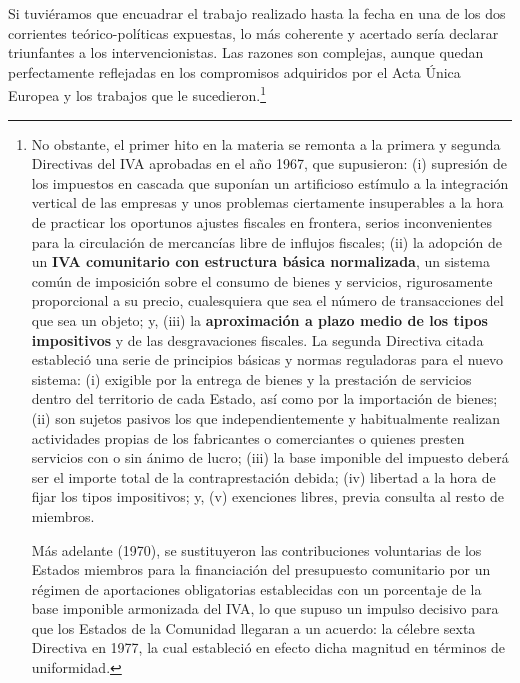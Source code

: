 \documentclass[10pt,a4paper]{article}
\begin{document}
Si tuviéramos que encuadrar el trabajo realizado hasta la fecha en una de los dos corrientes teórico-políticas expuestas, lo más coherente y acertado sería declarar triunfantes a los intervencionistas. Las razones son complejas, aunque quedan perfectamente reflejadas en los compromisos adquiridos por el Acta Única Europea y los trabajos que le sucedieron.\footnote{%
    No obstante, el primer hito en la materia se remonta a la primera y segunda Directivas del IVA aprobadas en el año 1967, que supusieron: (i) supresión de los impuestos en cascada que suponían un artificioso estímulo a la integración vertical de las empresas y unos problemas ciertamente insuperables a la hora de practicar los oportunos ajustes fiscales en frontera, serios inconvenientes para la circulación de mercancías libre de influjos fiscales; (ii) la adopción de un \textbf{IVA comunitario con estructura básica normalizada}, un sistema común de imposición sobre el consumo de bienes y servicios, rigurosamente proporcional a su precio, cualesquiera que sea el número de transacciones del que sea un objeto; y, (iii) la \textbf{aproximación a plazo medio de los tipos impositivos} y de las desgravaciones fiscales. La segunda Directiva citada estableció una serie de principios básicas y normas reguladoras para el nuevo sistema: (i) exigible por la entrega de bienes y la prestación de servicios dentro del territorio de cada Estado, así como por la importación de bienes; (ii) son sujetos pasivos los que independientemente y habitualmente realizan actividades propias de los fabricantes o comerciantes o quienes presten servicios con o sin ánimo de lucro; (iii) la base imponible del impuesto deberá ser el importe total de la contraprestación debida; (iv) libertad a la hora de fijar los tipos impositivos; y, (v) exenciones libres, previa consulta al resto de miembros.

Más adelante (1970), se sustituyeron las contribuciones voluntarias de los Estados miembros para la financiación del presupuesto comunitario por un régimen de aportaciones obligatorias establecidas con un porcentaje de la base imponible armonizada del IVA, lo que supuso un impulso decisivo para que los Estados de la Comunidad llegaran a un acuerdo: la célebre sexta Directiva en 1977, la cual estableció en efecto dicha magnitud en términos de uniformidad.
}
\end{document}
